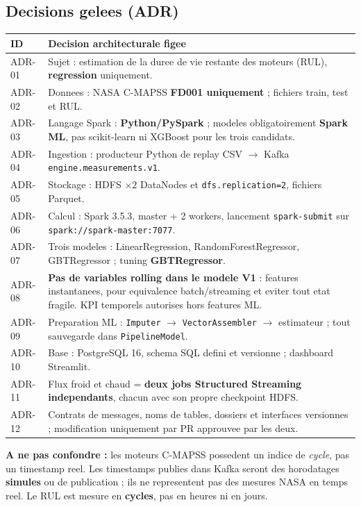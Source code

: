 \documentclass[10pt,a4paper]{article}
\newcommand{\code}[1]{{\small\ttfamily\nolinkurl{#1}}}
\begin{document}
\subsection{Decisions gelees (ADR)}
\begin{tabularx}{\linewidth}{@{}p{13mm}Y@{}}
\toprule
\textbf{ID} & \textbf{Decision architecturale figee}\\\midrule
ADR-01 & Sujet : estimation de la duree de vie restante des moteurs (RUL), \textbf{regression} uniquement.\\
ADR-02 & Donnees : NASA C-MAPSS \textbf{FD001 uniquement} ; fichiers train, test et RUL.\\
ADR-03 & Langage Spark : \textbf{Python/PySpark} ; modeles obligatoirement \textbf{Spark ML}, pas scikit-learn ni XGBoost pour les trois candidats.\\
ADR-04 & Ingestion : producteur Python de replay CSV \(\rightarrow\) Kafka \code{engine.measurements.v1}.\\
ADR-05 & Stockage : HDFS \(\times 2\) DataNodes et \code{dfs.replication=2}, fichiers Parquet.\\
ADR-06 & Calcul : Spark 3.5.3, master + 2 workers, lancement \code{spark-submit} sur \code{spark://spark-master:7077}.\\
ADR-07 & Trois modeles : LinearRegression, RandomForestRegressor, GBTRegressor ; tuning \textbf{GBTRegressor}.\\
ADR-08 & \textbf{Pas de variables rolling dans le modele V1} : features instantanees, pour equivalence batch/streaming et eviter tout etat fragile. KPI temporels autorises hors features ML.\\
ADR-09 & Preparation ML : \code{Imputer} \(\rightarrow\) \code{VectorAssembler} \(\rightarrow\) estimateur ; tout sauvegarde dans \code{PipelineModel}.\\
ADR-10 & Base : PostgreSQL 16, schema SQL defini et versionne ; dashboard Streamlit.\\
ADR-11 & Flux froid et chaud = \textbf{deux jobs Structured Streaming independants}, chacun avec son propre checkpoint HDFS.\\
ADR-12 & Contrats de messages, noms de tables, dossiers et interfaces versionnes ; modification uniquement par PR approuvee par les deux.\\
\bottomrule
\end{tabularx}

\begin{warningbox}
\textbf{A ne pas confondre :} les moteurs C-MAPSS possedent un indice de \emph{cycle}, pas un timestamp reel. Les timestamps publies dans Kafka seront des horodatages \textbf{simules} ou de publication ; ils ne representent pas des mesures NASA en temps reel. Le RUL est mesure en \textbf{cycles}, pas en heures ni en jours.
\end{warningbox}
\end{document}
